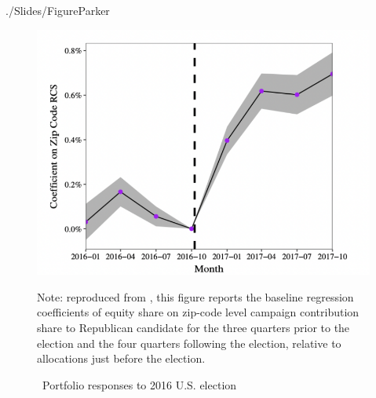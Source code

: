 


\begin{verbatimwrite}{./Slides/FigureParker}%
  \begin{figure}[!ht] \centering  %
    \caption{ ~Portfolio responses to 2016 U.S. election}
    \label{fig:parker}
    \centerline{\includegraphics[width=1.5\textwidth]{./figures/parker}}
    \begin{flushleft}
      {\footnotesize Note: reproduced from \cite{meeuwis2018belief}, this figure reports the baseline regression coefficients of equity share on zip-code level  campaign contribution share to Republican candidate for the three quarters prior to the election and the four quarters following the election, relative to allocations just before the election.}
    \end{flushleft}
  \end{figure}
\end{verbatimwrite}%


